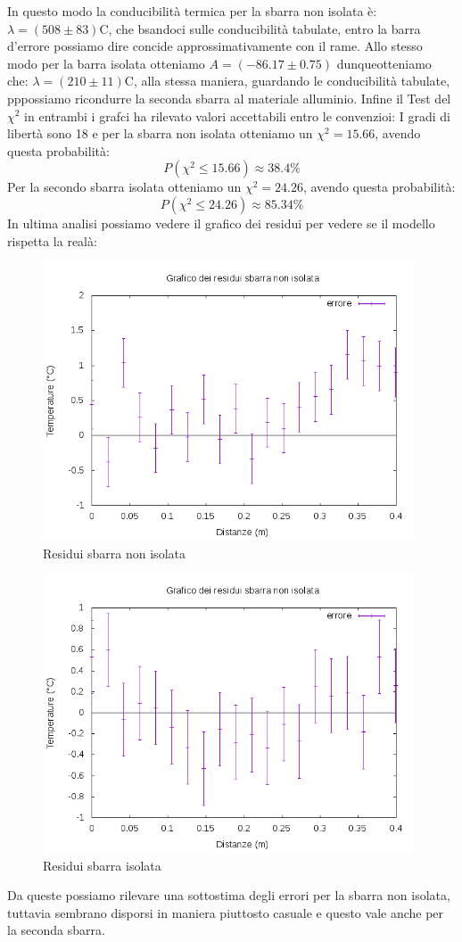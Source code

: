 \documentclass[a4paper,10pt]{article}
\begin{document}
In questo modo la conducibilità termica per la sbarra non isolata è: $\lambda=(508\pm83)$\textcelsius C, che bsandoci sulle conducibilità tabulate, entro la barra d'errore possiamo dire concide 
approssimativamente con il rame.
Allo stesso modo per la barra isolata otteniamo $A=(-86.17\pm0.75)$ dunqueotteniamo che:  $\lambda=(210\pm11)$\textcelsius C, alla stessa maniera, guardando le conducibilità tabulate, pppossiamo ricondurre la seconda
sbarra al materiale alluminio.
Infine il Test del $\chi^2$ in entrambi i grafci ha rilevato valori accettabili entro le convenzioi:
I gradi di libertà sono 18 e per la sbarra non isolata otteniamo un $\chi^2=15.66$, avendo questa probabilità:
\begin{displaymath}
 P(\chi^2\leq15.66)\approx38.4\%
\end{displaymath}
Per la secondo sbarra isolata otteniamo un $\chi^2=24.26$, avendo questa probabilità:
\begin{displaymath}
 P(\chi^2\leq24.26)\approx85.34\%
\end{displaymath}
In ultima analisi possiamo vedere il grafico dei residui per vedere se il modello rispetta la realà:
\begin{figure}[H]
 \centering
 \caption{Residui sbarra non isolata}
 \includegraphics[width=11cm]{Residui non isolata.png}
\end{figure}
\begin{figure}[H]
 \centering
 \caption{Residui sbarra isolata}
 \includegraphics[width=11cm]{Residui isolata.png}
\end{figure}
Da queste possiamo rilevare una sottostima degli errori per la sbarra non isolata, tuttavia sembrano disporsi in maniera piuttosto casuale e questo vale anche per la seconda sbarra.
\end{document}
